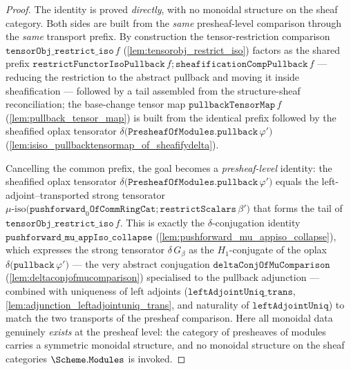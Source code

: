 \begin{proof}
  The identity is proved \emph{directly}, with no monoidal structure on the sheaf category. Both
  sides are built from the \emph{same} presheaf-level comparison through the \emph{same} transport
  prefix. By construction the tensor-restriction comparison
  \(\mathtt{tensorObj\_restrict\_iso}\,f\) (\cref{lem:tensorobj_restrict_iso}) factors as the shared
  prefix \(\mathtt{restrictFunctorIsoPullback}\,f \mathbin{;} \mathtt{sheafificationCompPullback}\,f\)
  --- reducing the restriction to the abstract pullback and moving it inside sheafification ---
  followed by a tail assembled from the structure-sheaf reconciliation; the base-change tensor map
  \(\mathtt{pullbackTensorMap}\,f\) (\cref{lem:pullback_tensor_map}) is built from the identical
  prefix followed by the sheafified oplax tensorator
  \(\delta\bigl(\mathtt{PresheafOfModules.pullback}\,\varphi'\bigr)\)
  (\cref{lem:isiso_pullbacktensormap_of_sheafifydelta}).

  Cancelling the common prefix, the goal becomes a \emph{presheaf-level} identity: the sheafified
  oplax tensorator \(\delta\bigl(\mathtt{PresheafOfModules.pullback}\,\varphi'\bigr)\) equals the
  left-adjoint--transported strong tensorator
  \(\mu\text{-iso}\bigl(\mathtt{pushforward}_0\mathtt{OfCommRingCat} \mathbin{;} \mathtt{restrictScalars}\,
  \beta'\bigr)\) that forms the tail of \(\mathtt{tensorObj\_restrict\_iso}\,f\). This is exactly the
  \(\delta\)-conjugation identity \(\mathtt{pushforward\_mu\_appIso\_collapse}\)
  (\cref{lem:pushforward_mu_appiso_collapse}), which expresses the strong tensorator
  \(\delta\,G_\beta\) as the \(H_1\)-conjugate of the oplax
  \(\delta\bigl(\mathtt{pullback}\,\varphi'\bigr)\) --- the very abstract conjugation
  \(\mathtt{deltaConjOfMuComparison}\) (\cref{lem:deltaconjofmucomparison}) specialised to the
  pullback adjunction --- combined with uniqueness of left adjoints
  (\(\mathtt{leftAdjointUniq\_trans}\), \cref{lem:adjunction_leftadjointuniq_trans}, and naturality of
  \(\mathtt{leftAdjointUniq}\)) to match the two transports of the presheaf comparison. Here all
  monoidal data genuinely \emph{exists} at the presheaf level: the category of presheaves of
  modules carries a symmetric monoidal structure, and no monoidal structure on the sheaf
  categories \(\Scheme.\mathtt{Modules}\) is invoked.


\end{proof}
